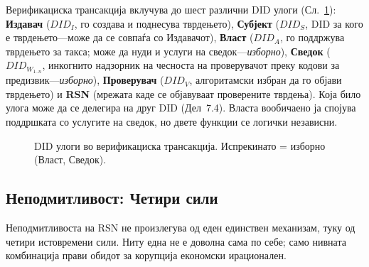 \documentclass[11pt,a4paper,twocolumn]{article}
\begin{document}
Верификациска трансакција вклучува до шест различни DID улоги (Сл.~\ref{fig:roles}): \textbf{Издавач} ($DID_I$, го создава и поднесува тврдењето), \textbf{Субјект} ($DID_S$, DID за кого е тврдењето---може да се совпаѓа со Издавачот), \textbf{Власт} ($DID_A$, го поддржува тврдењето за такса; може да нуди и услуги на сведок---\emph{изборно}), \textbf{Сведок} ($DID_{W_{1..n}}$, инкогнито надзорник на чесноста на проверувачот преку кодови за предизвик---\emph{изборно}), \textbf{Проверувач} ($DID_V$, алгоритамски избран да го објави тврдењето) и \textbf{RSN} (мрежата каде се објавуваат проверените тврдења). Која било улога може да се делегира на друг DID (Дел~7.4). Власта вообичаено ја спојува поддршката со услугите на сведок, но двете функции се логички независни.

\begin{figure}[ht]
\centering
{}
\caption{DID улоги во верификациска трансакција. Испрекинато = изборно (Власт, Сведок).}
\label{fig:roles}
\end{figure}

\subsection{Неподмитливост: Четири сили}

Неподмитливоста на RSN не произлегува од еден единствен механизам, туку од четири истовремени сили. Ниту една не е доволна сама по себе; само нивната комбинација прави обидот за корупција економски ирационален.
\end{document}
